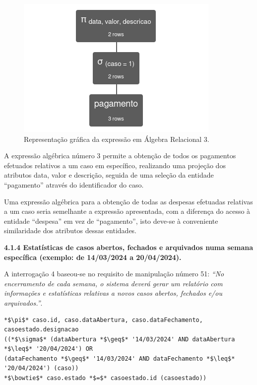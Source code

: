 \documentclass[a4paper,12pt]{scrreprt}
\begin{document}
\begin{figure}[!ht]
    \centering
    \includegraphics[scale=0.9]{images/relax/3.png}
    \caption{Representação gráfica da expressão em Álgebra Relacional 3.}
\end{figure}
\vspace{0.2cm}

A expressão algébrica número 3 permite a obtenção de todos os pagamentos efetuados relativos a um caso em específico, realizando uma projeção dos atributos data, valor e descrição, seguida de uma seleção da entidade “pagamento” através do identificador do caso.

Uma expressão algébrica para a obtenção de todas as despesas efetuadas relativas a um caso seria semelhante a expressão apresentada, com a diferença do acesso à entidade “despesa” em vez de “pagamento”, isto deve-se à conveniente similaridade dos atributos dessas entidades. 

\clearpage %
{\large\textbf{4.1.4 Estatísticas de casos abertos, fechados e arquivados numa semana específica (exemplo: de 14/03/2024 a 20/04/2024).}}

\vspace{0.2cm}

A interrogação 4 baseou-se no requisito de manipulação número 51: \textit{“No encerramento de cada semana, o sistema deverá gerar um relatório com informações e estatísticas relativas a novos casos abertos, fechados e/ou arquivados.”}.

\vspace{0.2cm}

\begin{lstlisting}[escapechar=*]
*$\pi$* caso.id, caso.dataAbertura, caso.dataFechamento, casoestado.designacao
((*$\sigma$* (dataAbertura *$\geq$* '14/03/2024' AND dataAbertura *$\leq$* '20/04/2024') OR
(dataFechamento *$\geq$* '14/03/2024' AND dataFechamento *$\leq$* '20/04/2024') (caso))
*$\bowtie$* caso.estado *$=$* casoestado.id (casoestado))
\end{lstlisting}
\end{document}

